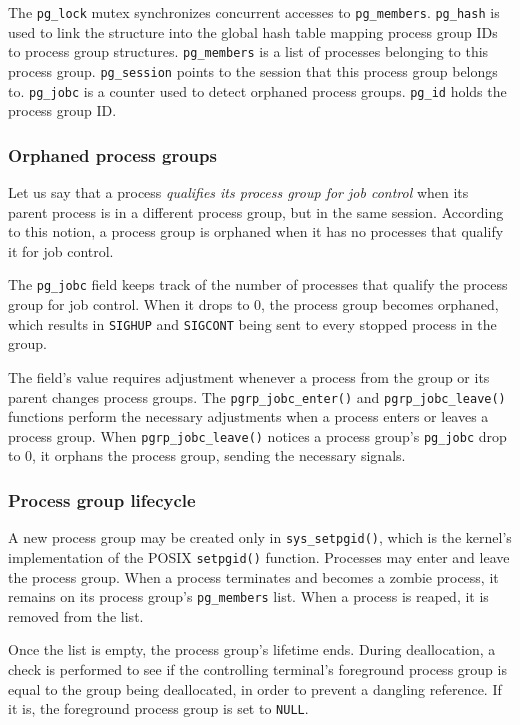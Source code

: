 \documentclass[shortabstract, manyadvisors, english, mgr]{iithesis}
\begin{document}
The \texttt{pg\_lock} mutex synchronizes concurrent accesses to
\texttt{pg\_members}. \texttt{pg\_hash} is used to link the structure into the
global hash table mapping process group IDs to process group structures.
\texttt{pg\_members} is a list of processes belonging to this process group.
\texttt{pg\_session} points to the session that this process group belongs to.
\texttt{pg\_jobc} is a counter used to detect orphaned process groups.
\texttt{pg\_id} holds the process group ID.

\subsubsection{Orphaned process groups}

Let us say that a process \textit{qualifies its process group for job control}
when its parent process is in a different process group, but in the same
session. According to this notion, a process group is orphaned when it has no
processes that qualify it for job control.

The \texttt{pg\_jobc} field keeps track of the number of processes that qualify
the process group for job control. When it drops to 0, the process group becomes
orphaned, which results in \texttt{SIGHUP} and \texttt{SIGCONT} being sent to
every stopped process in the group.

The field's value requires adjustment whenever a process from the group or its
parent changes process groups. The \texttt{pgrp\_jobc\_enter()} and
\texttt{pgrp\_jobc\_leave()} functions perform the necessary adjustments when a
process enters or leaves a process group. When \texttt{pgrp\_jobc\_leave()}
notices a process group's \texttt{pg\_jobc} drop to 0, it orphans the process
group, sending the necessary signals.

\subsubsection{Process group lifecycle}

A new process group may be created only in \texttt{sys\_setpgid()}, which is the
kernel's implementation of the POSIX \texttt{setpgid()} function. Processes may
enter and leave the process group. When a process terminates and becomes a
zombie process, it remains on its process group's \texttt{pg\_members} list.
When a process is reaped, it is removed from the list.

Once the list is empty, the process group's lifetime ends. During deallocation,
a check is performed to see if the controlling terminal's foreground process
group is equal to the group being deallocated, in order to prevent a dangling
reference. If it is, the foreground process group is set to \texttt{NULL}.
\end{document}
